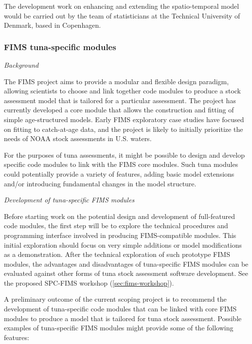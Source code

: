 \documentclass{SCreport}
\begin{document}
The development work on enhancing and extending the spatio-temporal model would
be carried out by the team of statisticians at the Technical University of
Denmark, based in Copenhagen.

\vspace{2ex}

\subsubsection{FIMS tuna-specific modules}
\label{sec:fims-development-project}

\textit{Background}

The FIMS project aims to provide a modular and flexible design paradigm,
allowing scientists to choose and link together code modules to produce a stock
assessment model that is tailored for a particular assessment. The project has
currently developed a core module that allows the construction and fitting of
simple age-structured models. Early FIMS exploratory case studies have focused
on fitting to catch-at-age data, and the project is likely to initially
prioritize the needs of NOAA stock assessments in U.S. waters.

For the purposes of tuna assessments, it might be possible to design and develop
specific code modules to link with the FIMS core modules. Such tuna modules
could potentially provide a variety of features, adding basic model extensions
and/or introducing fundamental changes in the model structure.

\vspace{2ex}

\textit{Development of tuna-specific FIMS modules}

Before starting work on the potential design and development of full-featured
code modules, the first step will be to explore the technical procedures and
programming interface involved in producing FIMS-compatible modules. This
initial exploration should focus on very simple additions or model modifications
as a demonstration. After the technical exploration of such prototype FIMS
modules, the advantages and disadvantages of tuna-specific FIMS modules can be
evaluated against other forms of tuna stock assessment software development. See
the proposed SPC-FIMS workshop (\autoref{sec:fims-workshop}).

A preliminary outcome of the current scoping project is to recommend the
development of tuna-specific code modules that can be linked with core FIMS
modules to produce a model that is tailored for tuna stock assessment. Possible
examples of tuna-specific FIMS modules might provide some of the following
features:
\end{document}
